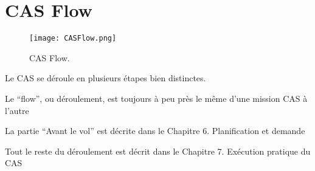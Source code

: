 \newpage

\chapter{CAS Flow}

\begin{figure}[H]
    \texttt{[image: CASFlow.png]}
    \caption{CAS Flow.}
    \label{fig:casflow}
\end{figure}

\e
    \item Le CAS se déroule en plusieurs étapes bien distinctes.
    \item Le ``flow'', ou déroulement, est toujours à peu près le même d’une mission CAS à l’autre
    \item La partie ``Avant le vol'' est décrite dans le Chapitre 6. Planification et demande %
    \item Tout le reste du déroulement est décrit dans le Chapitre 7. Exécution pratique du CAS %
\ed 